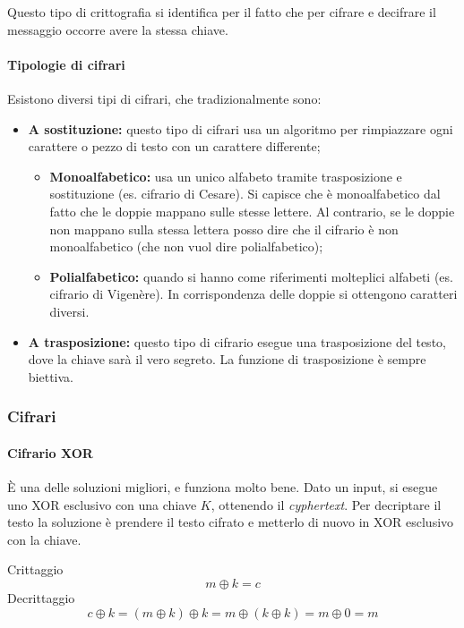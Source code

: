 Questo tipo di crittografia si identifica per il fatto che per cifrare e
decifrare il messaggio occorre avere la stessa chiave.

\paragraph*{Tipologie di cifrari} Esistono diversi tipi di cifrari, che
tradizionalmente sono:
\begin{itemize}
 \item \textbf{A sostituzione:} questo tipo di cifrari usa un
 algoritmo per rimpiazzare ogni carattere o pezzo di testo con un
 carattere differente;
 \begin{itemize}
  \item \textbf{Monoalfabetico:} usa un unico alfabeto tramite trasposizione e
sostituzione (es. cifrario di Cesare). Si capisce che è monoalfabetico dal fatto
che le doppie mappano sulle stesse lettere.
Al contrario, se le doppie non mappano sulla stessa lettera posso dire che il
cifrario è non monoalfabetico (che non vuol dire polialfabetico);
  \item \textbf{Polialfabetico:} quando si hanno come riferimenti 
  molteplici alfabeti (es. cifrario di Vigenère).
  In corrispondenza delle doppie si ottengono caratteri diversi.
 \end{itemize}
 \item \textbf{A trasposizione:} questo tipo di cifrario esegue una
 trasposizione del testo, dove la chiave sarà
 il vero segreto. La funzione di trasposizione è sempre biettiva.
 
\end{itemize}

\subsubsection{Cifrari}

\paragraph{Cifrario XOR}

È una delle soluzioni migliori, e funziona molto bene. Dato un input, si esegue
uno XOR esclusivo con una chiave $K$, ottenendo il \textit{cyphertext}. Per
decriptare il testo la soluzione è prendere il testo cifrato e metterlo di nuovo
in XOR esclusivo con la chiave.

Crittaggio
$$
m \oplus k = c
$$
\indent Decrittaggio
$$
c \oplus k = (m \oplus k) \oplus k = m \oplus (k \oplus k) = m \oplus 0 = m
$$

